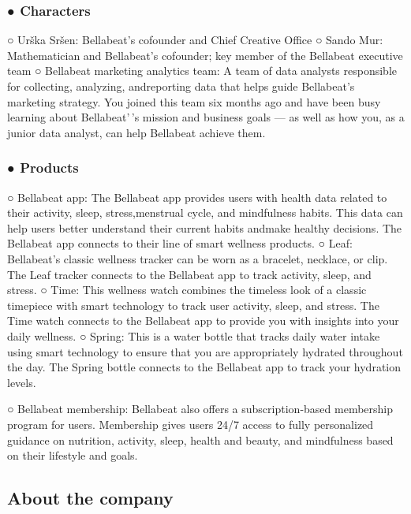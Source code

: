 \documentclass[
]{article}
\begin{document}
\hypertarget{characters}{%
\subsubsection{● Characters}\label{characters}}

○ Urška Sršen: Bellabeat's cofounder and Chief Creative Office ○ Sando
Mur: Mathematician and Bellabeat's cofounder; key member of the
Bellabeat executive team ○ Bellabeat marketing analytics team: A team of
data analysts responsible for collecting, analyzing, andreporting data
that helps guide Bellabeat's marketing strategy. You joined this team
six months ago and have been busy learning about Bellabeat'\,'s mission
and business goals --- as well as how you, as a junior data analyst, can
help Bellabeat achieve them.

\hypertarget{products}{%
\subsubsection{● Products}\label{products}}

○ Bellabeat app: The Bellabeat app provides users with health data
related to their activity, sleep, stress,menstrual cycle, and
mindfulness habits. This data can help users better understand their
current habits andmake healthy decisions. The Bellabeat app connects to
their line of smart wellness products. ○ Leaf: Bellabeat's classic
wellness tracker can be worn as a bracelet, necklace, or clip. The Leaf
tracker connects to the Bellabeat app to track activity, sleep, and
stress. ○ Time: This wellness watch combines the timeless look of a
classic timepiece with smart technology to track user activity, sleep,
and stress. The Time watch connects to the Bellabeat app to provide you
with insights into your daily wellness. ○ Spring: This is a water bottle
that tracks daily water intake using smart technology to ensure that you
are appropriately hydrated throughout the day. The Spring bottle
connects to the Bellabeat app to track your hydration levels.

○ Bellabeat membership: Bellabeat also offers a subscription-based
membership program for users. Membership gives users 24/7 access to
fully personalized guidance on nutrition, activity, sleep, health and
beauty, and mindfulness based on their lifestyle and goals.

\hypertarget{about-the-company}{%
\subsection{About the company}\label{about-the-company}}
\end{document}
